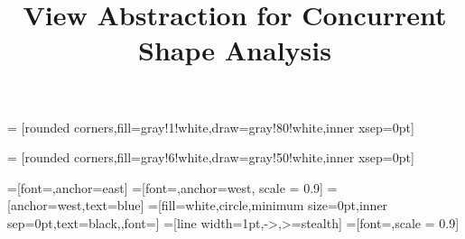 \title{View Abstraction for Concurrent Shape Analysis}
\author{}



\usepackage{array}
\usepackage{dsfont,bbm}
\usepackage[ruled,noend,nofillcomment,linesnumbered]{algorithm2e}


\usepackage{pgf}
\usepackage{tikz}
\usepackage{mdframed}
\usepackage{caption}
\usepackage{paralist}
\usepackage{todonotes}
\usepackage{url}
\usepackage{wrapfig}
\usepackage{multirow}
\usepackage{times}
\usepackage{listings}
\lstset{language=C,numberstyle=\footnotesize,
basicstyle=\ttfamily\footnotesize
}


\usetikzlibrary{automata,positioning}
\usetikzlibrary{trees}
\usetikzlibrary{shapes}
\usetikzlibrary{petri}
\usetikzlibrary{arrows}
\usetikzlibrary{backgrounds}
\usetikzlibrary{calc}
\usetikzlibrary{fit}
\usetikzlibrary{decorations.pathmorphing}
\usetikzlibrary{decorations.text}
\usetikzlibrary{shapes.callouts}





=
[rounded corners,fill=gray!1!white,draw=gray!80!white,inner xsep=0pt]%


=
[rounded corners,fill=gray!6!white,draw=gray!50!white,inner xsep=0pt]%

  
=[font={\footnotesize\tt},anchor=east]
=[font={\footnotesize\tt},anchor=west, scale = 0.9]
=[anchor=west,text=blue]
=[fill=white,circle,minimum size=0pt,inner sep=0pt,text=black,,font=\tiny]
=[line width=1pt,->,>=stealth]
=[font=\small,scale = 0.9]









